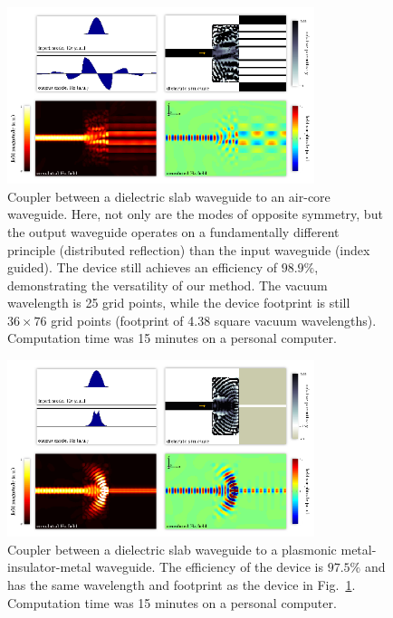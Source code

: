 \documentclass[letterpaper,10pt]{article}
\begin{document}
\begin{figure}[htb]
    \centering
    \includegraphics[width=0.8\textwidth]{3}
    \caption{Coupler between a dielectric slab waveguide to 
            an air-core waveguide.
        Here, not only are the modes of opposite symmetry,
            but the output waveguide operates on a fundamentally different
            principle (distributed reflection) than the input waveguide 
            (index guided).
        The device still achieves an efficiency of $98.9\%$, demonstrating the
            versatility of our method.
        The vacuum wavelength is 25 grid points, 
            while the device footprint is still $36 \times 76$ grid points
            (footprint of 4.38 square vacuum wavelengths).
        Computation time was 15 minutes on a personal computer.
        }
        \label{fig:aircore}
\end{figure}
\begin{figure}[htb]
    \centering
    \includegraphics[width=0.8\textwidth]{4}
    \caption{Coupler between a dielectric slab waveguide to 
            a plasmonic metal-insulator-metal waveguide.
        The efficiency of the device is $97.5\%$ and 
            has the same wavelength and footprint as the device in
            Fig.~\ref{fig:aircore}.
        Computation time was 15 minutes on a personal computer.
        }
        \label{fig:mim}
\end{figure}
\end{document}
